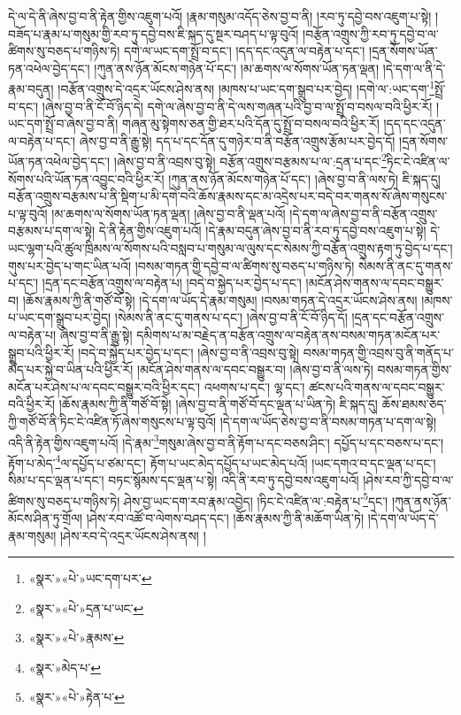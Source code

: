 དེ་ལ་དེ་ནི་ཞེས་བྱ་བ་ནི་རྟེན་གྱིས་འཇུག་པའོ། །རྣམ་གསུམ་འདོད་ཅེས་བྱ་བ་ནི། །རབ་ཏུ་དབྱེ་བས་འཇུག་པ་སྟེ། །བཟོད་པ་རྣམ་པ་གསུམ་གྱི་རབ་ཏུ་དབྱེ་བས་ཇི་སྐད་དུ་སྔར་བཤད་པ་ལྟ་བུའོ། །བརྩོན་འགྲུས་ཀྱི་རབ་ཏུ་དབྱེ་བ་ལ་ཚིགས་སུ་བཅད་པ་གཉིས་ཏེ། དགེ་ལ་ཡང་དག་སྤྲོ་བ་དང་། །དད་དང་འདུན་ལ་བརྟེན་པ་དང་། །དྲན་སོགས་ཡོན་ཏན་འཕེལ་བྱེད་དང་། །ཀུན་ནས་ཉོན་མོངས་གཉེན་པོ་དང་། །མ་ཆགས་ལ་སོགས་ཡོན་ཏན་ལྡན། །དེ་དག་ལ་ནི་དེ་རྣམ་བདུན། །བརྩོན་འགྲུས་དེ་འདྲར་ཡོངས་ཤེས་ནས། །མཁས་པ་ཡང་དག་སྒྲུབ་པར་བྱེད། །དགེ་ལ་:ཡང་དག་\footnote{«སྣར་»«པེ་»ཡང་དག་པར་}སྤྲོ་བ་དང་། །ཞེས་བྱ་བ་ནི་ངོ་བོ་ཉིད་དེ། དགེ་ལ་ཞེས་བྱ་བ་ནི་དེ་ལས་གཞན་པའི་བྱ་བ་ལ་སྤྲོ་བ་བསལ་བའི་ཕྱིར་རོ། །ཡང་དག་སྤྲོ་བ་ཞེས་བྱ་བ་ནི། གཞན་མུ་སྟེགས་ཅན་གྱི་ཐར་པའི་དོན་དུ་སྤྲོ་བ་བསལ་བའི་ཕྱིར་རོ། །དད་དང་འདུན་ལ་བརྟེན་པ་དང་། ཞེས་བྱ་བ་ནི་རྒྱུ་སྟེ། དད་པ་དང་དོན་དུ་གཉེར་བ་ནི་བརྩོན་འགྲུས་རྩོམ་པར་བྱེད་དོ། །དྲན་སོགས་ཡོན་ཏན་འཕེལ་བྱེད་དང་། །ཞེས་བྱ་བ་ནི་འབྲས་བུ་སྟེ། བརྩོན་འགྲུས་བརྩམས་པ་ལ་:དྲན་པ་དང་\footnote{«སྣར་»«པེ་»དྲན་པ་ཡང་}ཏིང་ངེ་འཛིན་ལ་སོགས་པའི་ཡོན་ཏན་འབྱུང་བའི་ཕྱིར་རོ། །ཀུན་ནས་ཉོན་མོངས་གཉེན་པོ་དང་། །ཞེས་བྱ་བ་ནི་ལས་ཏེ། ཇི་སྐད་དུ། བརྩོན་འགྲུས་བརྩམས་པ་ནི་སྡིག་པ་མི་དགེ་བའི་ཆོས་རྣམས་དང་མ་འདྲེས་པར་བདེ་བར་གནས་སོ་ཞེས་གསུངས་པ་ལྟ་བུའོ། །མ་ཆགས་ལ་སོགས་ཡོན་ཏན་ལྡན། །ཞེས་བྱ་བ་ནི་ལྡན་པའོ། །དེ་དག་ལ་ཞེས་བྱ་བ་ནི་བརྩོན་འགྲུས་བརྩམས་པ་དག་ལ་སྟེ། དེ་ནི་རྟེན་གྱིས་འཇུག་པའོ། །དེ་རྣམ་བདུན་ཞེས་བྱ་བ་ནི་རབ་ཏུ་དབྱེ་བས་འཇུག་པ་སྟེ། དེ་ཡང་ལྷག་པའི་ཚུལ་ཁྲིམས་ལ་སོགས་པའི་བསླབ་པ་གསུམ་ལ་ལུས་དང་སེམས་ཀྱི་བརྩོན་འགྲུས་རྟག་ཏུ་བྱེད་པ་དང་། གུས་པར་བྱེད་པ་གང་ཡིན་པའོ། །བསམ་གཏན་གྱི་དབྱེ་བ་ལ་ཚིགས་སུ་བཅད་པ་གཉིས་ཏེ། སེམས་ནི་ནང་དུ་གནས་པ་དང་། །དྲན་དང་བརྩོན་འགྲུས་ལ་བརྟེན་པ། །བདེ་བ་སྐྱེད་པར་བྱེད་པ་དང་། །མངོན་ཤེས་གནས་ལ་དབང་བསྒྱུར་བ། །ཆོས་རྣམས་ཀྱི་ནི་གཙོ་བོ་སྟེ། །དེ་དག་ལ་ཡོད་དེ་རྣམ་གསུམ། །བསམ་གཏན་དེ་འདྲར་ཡོངས་ཤེས་ནས། །མཁས་པ་ཡང་དག་སྒྲུབ་པར་བྱེད། །སེམས་ནི་ནང་དུ་གནས་པ་དང་། །ཞེས་བྱ་བ་ནི་ངོ་བོ་ཉིད་དོ། །དྲན་དང་བརྩོན་འགྲུས་ལ་བརྟེན་པ། ཞེས་བྱ་བ་ནི་རྒྱུ་སྟེ། དམིགས་པ་མ་བརྗེད་ན་བརྩོན་འགྲུས་ལ་བརྟེན་ནས་བསམ་གཏན་མངོན་པར་སྒྲུབ་པའི་ཕྱིར་རོ། །བདེ་བ་སྐྱེད་པར་བྱེད་པ་དང་། །ཞེས་བྱ་བ་ནི་འབྲས་བུ་སྟེ། བསམ་གཏན་གྱི་འབྲས་བུ་ནི་གནོད་པ་མེད་པར་སྐྱེ་བ་ཡིན་པའི་ཕྱིར་རོ། །མངོན་ཤེས་གནས་ལ་དབང་བསྒྱུར་བ། །ཞེས་བྱ་བ་ནི་ལས་ཏེ། བསམ་གཏན་གྱིས་མངོན་པར་ཤེས་པ་ལ་དབང་བསྒྱུར་བའི་ཕྱིར་དང་། འཕགས་པ་དང་། ལྷ་དང་། ཚངས་པའི་གནས་ལ་དབང་བསྒྱུར་བའི་ཕྱིར་རོ། །ཆོས་རྣམས་ཀྱི་ནི་གཙོ་བོ་སྟེ། །ཞེས་བྱ་བ་ནི་གཙོ་བོ་དང་ལྡན་པ་ཡིན་ཏེ། ཇི་སྐད་དུ། ཆོས་ཐམས་ཅད་ཀྱི་གཙོ་བོ་ནི་ཏིང་ངེ་འཛིན་ཏོ་ཞེས་གསུངས་པ་ལྟ་བུའོ། །དེ་དག་ལ་ཡོད་ཅེས་བྱ་བ་ནི་བསམ་གཏན་པ་དག་ལ་སྟེ། འདི་ནི་རྟེན་གྱིས་འཇུག་པའོ། །དེ་རྣམ་\footnote{«སྣར་»«པེ་»རྣམས་}གསུམ་ཞེས་བྱ་བ་ནི་རྟོག་པ་དང་བཅས་ཤིང་། དཔྱོད་པ་དང་བཅས་པ་དང་། རྟོག་པ་མེད་\footnote{«སྣར་»མེད་པ་}ལ་དཔྱོད་པ་ཙམ་དང་། རྟོག་པ་ཡང་མེད་དཔྱོད་པ་ཡང་མེད་པའོ། །ཡང་དགའ་བ་དང་ལྡན་པ་དང་། སིམ་པ་དང་ལྡན་པ་དང་། བཏང་སྙོམས་དང་ལྡན་པ་སྟེ། འདི་ནི་རབ་ཏུ་དབྱེ་བས་འཇུག་པའོ། །ཤེས་རབ་ཀྱི་དབྱེ་བ་ལ་ཚིགས་སུ་བཅད་པ་གཉིས་ཏེ། ཤེས་བྱ་ཡང་དག་རབ་རྣམ་འབྱེད། །ཏིང་ངེ་འཛིན་ལ་:བརྟེན་པ་\footnote{«སྣར་»«པེ་»རྟེན་པ་}དང་། །ཀུན་ནས་ཉོན་མོངས་ཤིན་ཏུ་གྲོལ། །ཤེས་རབ་འཚོ་བ་ལེགས་བཤད་དང་། །ཆོས་རྣམས་ཀྱི་ནི་མཆོག་ཡིན་ཏེ། །དེ་དག་ལ་ཡོད་དེ་རྣམ་གསུམ། །ཤེས་རབ་དེ་འདྲར་ཡོངས་ཤེས་ནས། །
